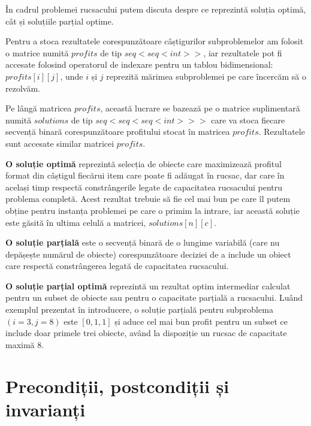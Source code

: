 \begin{sloppypar}

În cadrul problemei rucsacului putem discuta despre ce reprezintă soluția optimă, cât și soluțiile parțial optime. \par
Pentru a stoca rezultatele corespunzătoare câștigurilor subproblemelor am folosit o matrice numită $profits$ de tip \(seq<seq<int>>\), iar rezultatele pot fi accesate folosind operatorul de indexare pentru un tablou bidimensional: $profits[i][j]$, unde $i$ și $j$ reprezită mărimea subproblemei pe care încercăm să o rezolvăm.
\par
Pe lângă matricea $profits$, această lucrare se bazează pe o matrice suplimentară numită $solutions$ de tip \(seq<seq<seq<int>>>\) care va stoca fiecare secvență binară corespunzătoare profitului stocat în matricea $profits$. Rezultatele sunt accesate similar matricei $profits$.
\par
\textbf{O soluție optimă} reprezintă selecția de obiecte care maximizează profitul format din câștigul fiecărui item care poate fi adăugat în rucsac, dar care în același timp respectă constrângerile legate de capacitatea rucsacului pentru problema completă. Acest rezultat trebuie să fie cel mai bun pe care îl putem obține pentru instanța problemei pe care o primim la intrare, iar această soluție este găsită în ultima celulă a matricei, $solutions[n][c]$.
\par
\textbf{O soluție parțială} este o secvență binară de o lungime variabilă (care nu depășește numărul de obiecte) corespunzătoare deciziei de a include un obiect care respectă constrângerea legată de capacitatea rucsacului. \par
\textbf{O soluție parțial optimă} reprezintă un rezultat optim intermediar calculat pentru un subset de obiecte sau pentru o capacitate parțială a rucsacului. Luând exemplul prezentat în introducere, o soluție parțială pentru subproblema $(i = 3, j = 8)$ este $[0, 1, 1]$ și aduce cel mai bun profit pentru un subset ce include doar primele trei obiecte, având la dispoziție un rucsac de capacitate maximă 8.

\end{sloppypar}

\section{Precondiții, postcondiții și invarianți}


